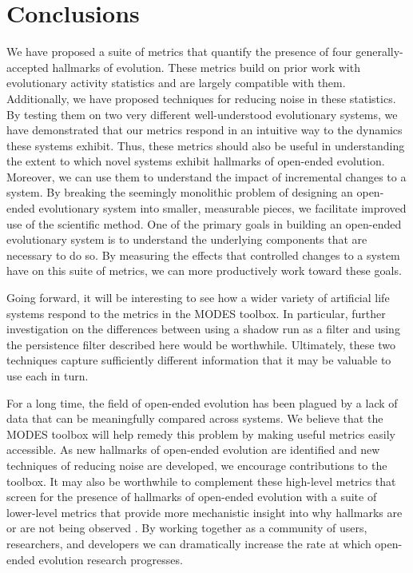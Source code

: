 \documentclass[letterpaper]{article}
\begin{document}
\section{Conclusions}
We have proposed a suite of metrics that quantify the presence of four generally-accepted hallmarks of evolution. These metrics build on prior work with evolutionary activity statistics and are largely compatible with them. Additionally, we have proposed techniques for reducing noise in these statistics.  By testing them on two very different well-understood evolutionary systems, we have demonstrated that our metrics respond in an intuitive way to the dynamics these systems exhibit. Thus, these metrics should also be useful in understanding the extent to which novel systems exhibit hallmarks of open-ended evolution. Moreover, we can use them to understand the impact of incremental changes to a system. By breaking the seemingly monolithic problem of designing an open-ended evolutionary system into smaller, measurable pieces, we facilitate improved use of the scientific method. One of the primary goals in building an open-ended evolutionary system is to understand the underlying components that are necessary to do so. By measuring the effects that controlled changes to a system have on this suite of metrics, we can more productively work toward these goals.

Going forward, it will be interesting to see how a wider variety of artificial life systems respond to the metrics in the MODES toolbox. In particular, further investigation on the differences between using a shadow run as a filter and using the persistence filter described here would be worthwhile. Ultimately, these two techniques capture sufficiently different information that it may be valuable to use each in turn.

For a long time, the field of open-ended evolution has been plagued by a lack of data that can be meaningfully compared across systems. We believe that the MODES toolbox will help remedy this problem by making useful metrics easily accessible. As new hallmarks of open-ended evolution are identified and new techniques of reducing noise are developed, we encourage contributions to the toolbox. It may also be worthwhile to complement these high-level metrics that screen for the presence of hallmarks of open-ended evolution with a suite of lower-level metrics that provide more mechanistic insight into why hallmarks are or are not being observed \citep{dolson_quantifying_2018}. By working together as a community of users, researchers, and developers we can dramatically increase the rate at which open-ended evolution research progresses.
\end{document}
